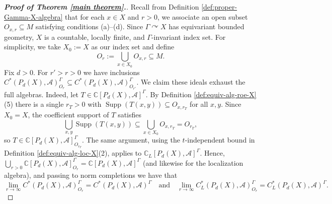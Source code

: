 \documentclass[pdflatex]{sn-jnl}
\theoremstyle{plain}
\theoremstyle{definition}
\begin{document}
\begin{proof}[\textbf{Proof of Theorem \ref{main theorem}.}]\normalsize
Recall from Definition \ref{def:proper-Gamma-X-algebra} that for each $x\in X$ and $r>0$, we associate an open subset $O_{x,r}\subseteq M$ satisfying conditions (a)--(d). Since $\Gamma\curvearrowright X$ has equivariant bounded geometry, $X$ is a countable, locally finite, and $\Gamma$-invariant index set. For simplicity, we take $X_{0}:=X$ as our index set and define
\[O_{r}:=\bigcup_{x\in X_0} O_{x,r}\subseteq M.\]
Fix $d>0$. For $r'>r>0$ we have inclusions
$C^{*}(P_{d}(X),\mathcal{A})^\Gamma_{O_r}\subseteq
C^{*}(P_{d}(X),\mathcal{A})^\Gamma_{O_{r'}}$. We claim these ideals exhaust the full algebras. Indeed, let
$T\in\mathbb{C}[P_{d}(X),\mathcal{A}]^\Gamma$. By
Definition \ref{def:equiv-alg-roe-X}(5) there is a single $r_T>0$ with
$\operatorname{Supp}(T(x,y))\subseteq O_{x,r_T}$ for all $x,y$. Since
$X_0=X$, the coefficient support of $T$ satisfies
\[\bigcup_{x,y}\operatorname{Supp}(T(x,y))\subseteq
\bigcup_{x\in X_0}O_{x,r_T}=O_{r_T},\]
so $T\in\mathbb{C}[P_{d}(X),\mathcal{A}]^\Gamma_{O_{r_T}}$. The same argument,
using the $t$-independent bound in Definition \ref{def:equiv-alg-loc-X}(2),
applies to $\mathbb{C}_{L}[P_{d}(X),\mathcal{A}]^\Gamma$. Hence,
$\bigcup_{r>0}\mathbb{C}[P_{d}(X),\mathcal{A}]^\Gamma_{O_r}
=\mathbb{C}[P_{d}(X),\mathcal{A}]^\Gamma$
(and likewise for the localization algebra), and passing to norm completions
we have that
\[\lim_{r\to\infty }C^{*}(P_{d}(X),\mathcal{A})^\Gamma_{O_r}
=C^{*}(P_{d}(X),\mathcal{A})^\Gamma
\quad\text{and}\quad
\lim_{r\to\infty}C_L^{*}(P_{d}(X),\mathcal{A})^\Gamma_{O_r}
=C_{L}^{*}(P_{d}(X),\mathcal{A})^\Gamma.\]


\end{proof}
\end{document}
